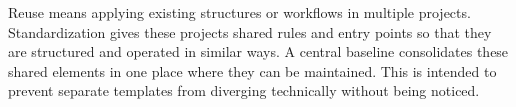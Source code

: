 \begin{beginnerstatement}

Reuse means applying existing structures or workflows in multiple projects.
Standardization gives these projects shared rules and entry points so that they
are structured and operated in similar ways. A central baseline consolidates
these shared elements in one place where they can be maintained. This is
intended to prevent separate templates from diverging technically without being noticed.

\end{beginnerstatement}

